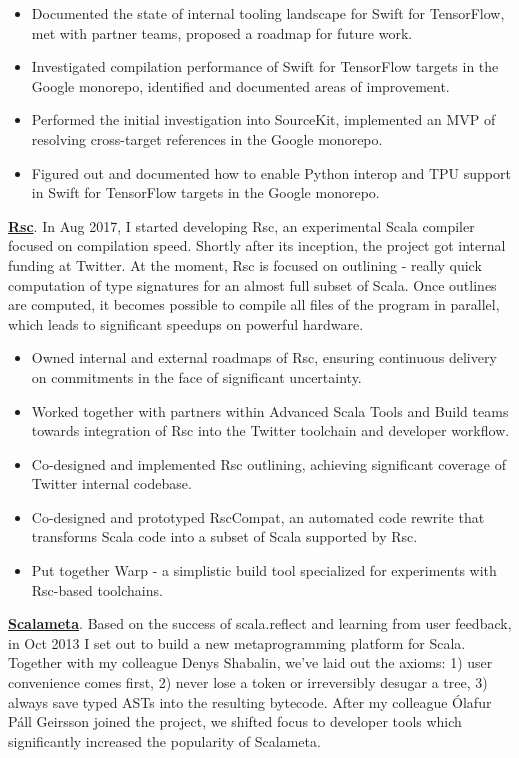 \documentclass[margin, 10pt]{Stylesheet}
\begin{document}
\begin{resume}
\begin{itemize} \itemsep -2pt
\item Documented the state of internal tooling landscape for Swift for TensorFlow,
met with partner teams, proposed a roadmap for future work.
\item Investigated compilation performance of Swift for TensorFlow targets in
the Google monorepo, identified and documented areas of improvement.
\item Performed the initial investigation into SourceKit, implemented an MVP of
resolving cross-target references in the Google monorepo.
\item Figured out and documented how to enable Python interop and TPU support in
Swift for TensorFlow targets in the Google monorepo.
\end{itemize}

\textbf{\href{https://github.com/twitter/rsc}{Rsc}}. In Aug 2017, I started developing Rsc,
an experimental Scala compiler focused on compilation speed. Shortly after its inception,
the project got internal funding at Twitter. At the moment, Rsc is focused on outlining - really
quick computation of type signatures for an almost full subset of Scala. Once outlines are computed,
it becomes possible to compile all files of the program in parallel, which leads to significant
speedups on powerful hardware.

\begin{itemize} \itemsep -2pt
\item Owned internal and external roadmaps of Rsc, ensuring continuous delivery
on commitments in the face of significant uncertainty.
\item Worked together with partners within Advanced Scala Tools and Build teams towards
integration of Rsc into the Twitter toolchain and developer workflow.
\item Co-designed and implemented Rsc outlining, achieving significant coverage of Twitter internal
codebase.
\item Co-designed and prototyped RscCompat, an automated code rewrite that transforms Scala code
into a subset of Scala supported by Rsc.
\item Put together Warp - a simplistic build tool specialized for experiments with Rsc-based
toolchains.
\end{itemize}

\textbf{\href{http://scalameta.org/}{Scalameta}}. Based on the success of scala.reflect and
learning from user feedback, in Oct 2013 I set out to build a new metaprogramming platform for
Scala. Together with my colleague Denys Shabalin, we've laid out the axioms: 1) user convenience
comes first, 2) never lose a token or irreversibly desugar a tree, 3) always save typed ASTs into
the resulting bytecode. After my colleague \'{O}lafur P\'{a}ll Geirsson joined the project, we
shifted focus to developer tools which significantly increased the popularity of Scalameta.


\end{resume}
\end{document}
